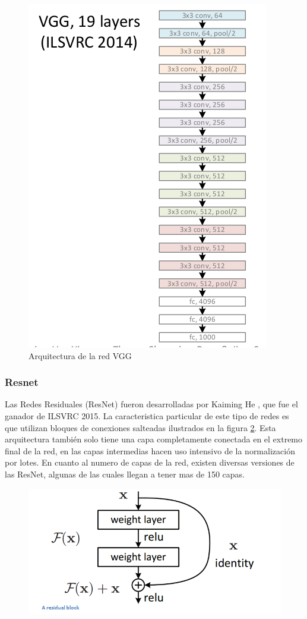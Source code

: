 \documentclass[a4paper,11pt,spanish]{book}
\begin{document}
	  \begin{figure}[h]
	    \begin{center}
	    \includegraphics[width=0.6\linewidth]{./img/vgg-19.png}
	    \end{center}
	    \caption{Arquitectura de la red VGG}
	    \label{fig:vgg}
	  \end{figure}	

	\subsubsection{Resnet}
	  Las Redes Residuales (ResNet) fueron desarrolladas por Kaiming He \cite{Kaiming:ResNet}, que fue el ganador de ILSVRC 2015. La caracteristica particular de este tipo de redes 
	  es que utilizan bloques de conexiones salteadas ilustrados en la figura \ref{fig:resnet}. 
	  Esta arquitectura también solo tiene una capa completamente conectada en el extremo final de la red, en las capas intermedias hacen uso intensivo de la normalización por lotes.
	  En cuanto al numero de capas de la red, existen diversas versiones de las ResNet, algunas de las cuales llegan a tener mas de 150 capas.
	
	  \begin{figure}[h]
	    \begin{center}
	    \includegraphics[width=0.6\linewidth]{./img/resnet_block.png}
	    \end{center}
	    \caption{}
	    \label{fig:resnet}
	  \end{figure}	
	
\end{document}
